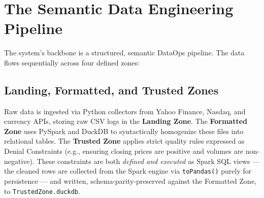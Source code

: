 \documentclass[10pt,journal,compsoc]{IEEEtran}
\begin{document}
\section{The Semantic Data Engineering Pipeline}
The system's backbone is a structured, semantic DataOps pipeline. The data flows sequentially across four defined zones:

\subsection{Landing, Formatted, and Trusted Zones}
Raw data is ingested via Python collectors from Yahoo Finance, Nasdaq, and currency APIs, storing raw CSV logs in the \textbf{Landing Zone}. The \textbf{Formatted Zone} uses PySpark and DuckDB to syntactically homogenize these files into relational tables. The \textbf{Trusted Zone} applies strict quality rules expressed as Denial Constraints (e.g., ensuring closing prices are positive and volumes are non-negative). These constraints are both \emph{defined and executed} as Spark SQL views — the cleaned rows are collected from the Spark engine via \texttt{toPandas()} purely for persistence — and written, schema-parity-preserved against the Formatted Zone, to \texttt{TrustedZone.duckdb}.
\end{document}
